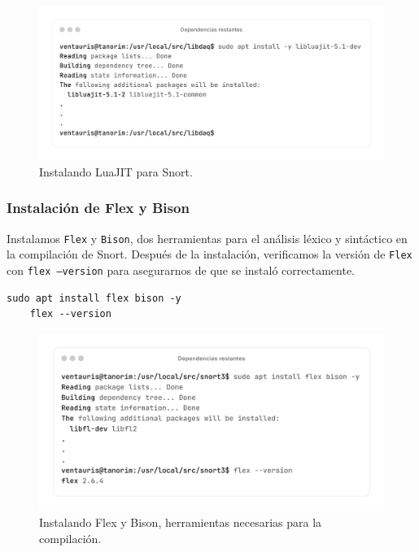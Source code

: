 \documentclass[11pt,a4paper,twoside]{report}
\begin{document}
\begin{figure}[H]
	\centering
	\includegraphics[scale=0.1]{instalacion_snort/16-16.png}
	\caption{Instalando LuaJIT para Snort.}
\end{figure}

\newpage

\subsubsection*{Instalación de Flex y Bison}

Instalamos \texttt{Flex} y \texttt{Bison}, dos herramientas para el análisis léxico y sintáctico en la compilación de Snort. Después de la instalación, verificamos la versión de \texttt{Flex} con \texttt{flex --version} para asegurarnos de que se instaló correctamente.

\begin{lstlisting}[style=commandstyle, caption={Instalando Flex y Bison y verificando la versión}]
	sudo apt install flex bison -y
	flex --version
\end{lstlisting}

\begin{figure}[H]
	\centering
	\includegraphics[scale=0.12]{instalacion_snort/19-19.png}
	\caption{Instalando Flex y Bison, herramientas necesarias para la compilación.}
\end{figure}
\end{document}
